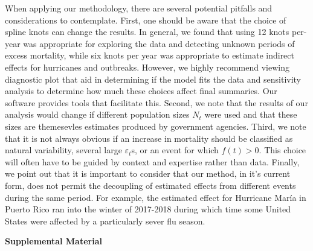 \documentclass[11pt]{article}
\begin{document}
When applying our methodology, there are several potential pitfalls and considerations to contemplate. First, one should be aware that the choice of spline knots can change the results.  In general, we found that using 12 knots per-year was appropriate for exploring the data and detecting unknown periods of excess mortality, while six knots per year was appropriate to estimate indirect effects for hurricanes and outbreaks. However, we highly recommend viewing diagnostic plot that aid in determining if the model fits the data and sensitivity analysis to determine how much these choices affect final summaries. Our software provides tools that facilitate this. Second, 
we note that the results of our analysis would change if different population sizes $N_t$ were used and that these sizes are themesevles estimates produced by government agencies. Third, 
we note that it is not always obvious if an increase in mortality should be classified as natural variability, several large $\varepsilon_t$s, or an event for which $f(t)>0$. This choice will often have to be guided by context and expertise rather than data. Finally, we point out that it is important to consider that our method, in it's current form, does not permit the decoupling of estimated effects from different events during the same period. For example, the estimated effect for Hurricane Mar\'ia in Puerto Rico ran into the winter of 2017-2018 during which time some United States were affected by a particularly sever flu season. 




\newpage
\begin{center}
\LARGE{\textbf{Supplemental Material}}
\end{center}
\end{document}
